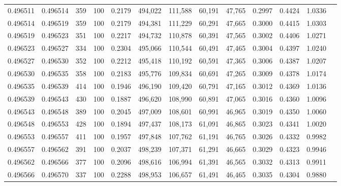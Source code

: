 \begin{tabular}{rrrrrrrrrrrrr}
0.496511 & 0.496514 &   359 & 100 &                                     0.2179 & 494,022 & 111,588 &  60,191 &  47,765 & 0.2997 & 0.4424 & 1.0336 \\
0.496514 & 0.496519 &   359 & 100 &                                     0.2179 & 494,381 & 111,229 &  60,291 &  47,665 & 0.3000 & 0.4415 & 1.0303 \\
0.496519 & 0.496523 &   351 & 100 &                                     0.2217 & 494,732 & 110,878 &  60,391 &  47,565 & 0.3002 & 0.4406 & 1.0271 \\
0.496523 & 0.496527 &   334 & 100 &                                     0.2304 & 495,066 & 110,544 &  60,491 &  47,465 & 0.3004 & 0.4397 & 1.0240 \\
0.496527 & 0.496530 &   352 & 100 &                                     0.2212 & 495,418 & 110,192 &  60,591 &  47,365 & 0.3006 & 0.4387 & 1.0207 \\
0.496530 & 0.496535 &   358 & 100 &                                     0.2183 & 495,776 & 109,834 &  60,691 &  47,265 & 0.3009 & 0.4378 & 1.0174 \\
0.496535 & 0.496539 &   414 & 100 &                                     0.1946 & 496,190 & 109,420 &  60,791 &  47,165 & 0.3012 & 0.4369 & 1.0136 \\
0.496539 & 0.496543 &   430 & 100 &                                     0.1887 & 496,620 & 108,990 &  60,891 &  47,065 & 0.3016 & 0.4360 & 1.0096 \\
0.496543 & 0.496548 &   389 & 100 &                                     0.2045 & 497,009 & 108,601 &  60,991 &  46,965 & 0.3019 & 0.4350 & 1.0060 \\
0.496548 & 0.496553 &   428 & 100 &                                     0.1894 & 497,437 & 108,173 &  61,091 &  46,865 & 0.3023 & 0.4341 & 1.0020 \\
0.496553 & 0.496557 &   411 & 100 &                                     0.1957 & 497,848 & 107,762 &  61,191 &  46,765 & 0.3026 & 0.4332 & 0.9982 \\
0.496557 & 0.496562 &   391 & 100 &                                     0.2037 & 498,239 & 107,371 &  61,291 &  46,665 & 0.3029 & 0.4323 & 0.9946 \\
0.496562 & 0.496566 &   377 & 100 &                                     0.2096 & 498,616 & 106,994 &  61,391 &  46,565 & 0.3032 & 0.4313 & 0.9911 \\
0.496566 & 0.496570 &   337 & 100 &                                     0.2288 & 498,953 & 106,657 &  61,491 &  46,465 & 0.3035 & 0.4304 & 0.9880 \\

\end{tabular}
